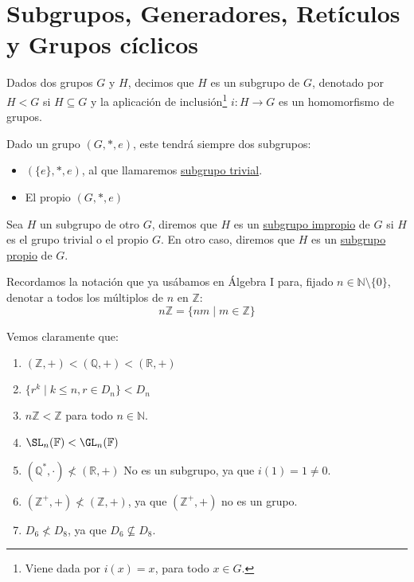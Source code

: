 \chapter{Subgrupos, Generadores, Retículos y Grupos cíclicos}
\begin{definicion}[Subgrupo]
    Dados dos grupos $G$ y $H$, decimos que $H$ es un subgrupo de $G$, denotado por $H < G$ si $H\subseteq G$ y la aplicación de inclusión\footnote{Viene dada por $i(x) = x$, para todo $x\in G$.} $i:H\to G$ es un homomorfismo de grupos.
\end{definicion}

\begin{observacion}
    Dado un grupo $(G,\ast,e)$, este tendrá siempre dos subgrupos:
    \begin{itemize}
        \item $(\{e\},\ast,e)$, al que llamaremos \underline{subgrupo trivial}.
        \item El propio $(G, \ast, e)$
    \end{itemize}
\end{observacion}

\begin{definicion}
    Sea $H$ un subgrupo de otro $G$, diremos que $H$ es un \underline{subgrupo impropio} de $G$ si $H$ es el grupo trivial o el propio $G$. En otro caso, diremos que $H$ es un \underline{subgrupo propio} de $G$.
\end{definicion}

\begin{notacion}
    Recordamos la notación que ya usábamos en Álgebra I para, fijado $n\in \mathbb{N}\setminus\{0\}$, denotar a todos los múltiplos de $n$ en $\mathbb{Z}$:
    \begin{equation*}
        n\mathbb{Z} = \{nm \mid m\in \mathbb{Z}\}
    \end{equation*}
\end{notacion}

\begin{ejemplo}
    Vemos claramente que:
    \begin{enumerate}
        \item $(\mathbb{Z},+) < (\mathbb{Q},+) < (\mathbb{R}, +)$
        \item $\{r^k \mid k\leq n, r\in D_n\} < D_n$ 
        \item $n\mathbb{Z} < \mathbb{Z}$ para todo $n\in \mathbb{N}$.
        \item $\SL_n(\mathbb{F}) < \GL_n(\mathbb{F})$
        \item $(\mathbb{Q}^\ast, \cdot) \not< (\mathbb{R}, +)$ No es un subgrupo, ya que $i(1) = 1 \neq 0$.
        \item $(\mathbb{Z}^+, +) \not< (\mathbb{Z}, +)$, ya que $(\mathbb{Z}^+, +)$ no es un grupo.
        \item $D_6 \not< D_8$, ya que $D_6\nsubseteq D_8$.
    \end{enumerate}
\end{ejemplo}

